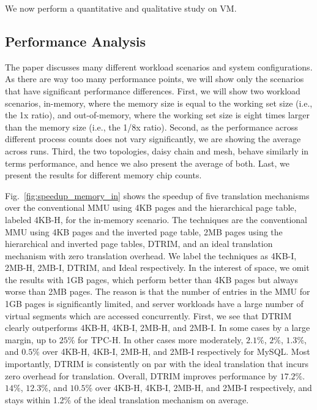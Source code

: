  


We now perform a quantitative and qualitative study on VM.

\subsection{Performance Analysis}

The paper discusses many different workload scenarios and system configurations. As there are way too many performance points, we will show only the scenarios that have significant performance differences. First, we will show two workload scenarios, in-memory, where the memory size is equal to the working set size (i.e., the 1x ratio), and out-of-memory, where the working set size is eight times larger than the memory size (i.e., the 1/8x ratio). Second, as the performance across different process counts does not vary significantly, we are showing the average across runs. Third, the two topologies, daisy chain and mesh, behave similarly in terms performance, and hence we also present the average of both. Last, we present the results for different memory chip counts.

Fig.~\ref{fig:speedup_memory_in} shows the speedup of five translation mechanisms over the conventional MMU using 4KB pages and the hierarchical page table, labeled 4KB-H, for the in-memory scenario. The techniques are the conventional MMU using 4KB pages and the inverted page table, 2MB pages using the hierarchical and inverted page tables, DTRIM, and an ideal translation mechanism with zero translation overhead. We label the techniques as 4KB-I, 2MB-H, 2MB-I, DTRIM, and Ideal respectively. In the interest of space, we omit the results with 1GB pages, which perform better than 4KB pages but always worse than 2MB pages. The reason is that the number of entries in the MMU for 1GB pages is significantly limited, and server workloads have a large number of virtual segments which are accessed concurrently. First, we see that DTRIM clearly outperforms 4KB-H, 4KB-I, 2MB-H, and 2MB-I. In some cases by a large margin, up to $25\%$ for TPC-H. In other cases more moderately, $2.1\%$, $2\%$, $1.3\%$, and $0.5\%$ over 4KB-H, 4KB-I, 2MB-H, and 2MB-I respectively for MySQL. Most importantly, DTRIM is consistently on par with the ideal translation that incurs zero overhead for translation. Overall, DTRIM improves performance by $17.2\%$. $14\%$, $12.3\%$, and $10.5\%$ over 4KB-H, 4KB-I, 2MB-H, and 2MB-I respectively, and stays within 1.2\% of the ideal translation mechanism on average.

